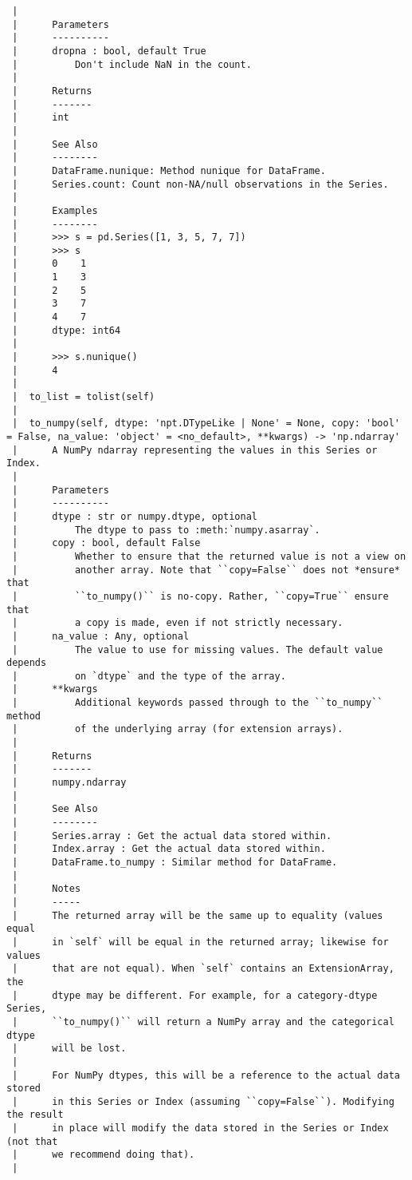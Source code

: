 \documentclass[
  letterpaper,
  DIV=11,
  numbers=noendperiod]{scrreprt}
\begin{document}
\begin{verbatim}
 |      
 |      Parameters
 |      ----------
 |      dropna : bool, default True
 |          Don't include NaN in the count.
 |      
 |      Returns
 |      -------
 |      int
 |      
 |      See Also
 |      --------
 |      DataFrame.nunique: Method nunique for DataFrame.
 |      Series.count: Count non-NA/null observations in the Series.
 |      
 |      Examples
 |      --------
 |      >>> s = pd.Series([1, 3, 5, 7, 7])
 |      >>> s
 |      0    1
 |      1    3
 |      2    5
 |      3    7
 |      4    7
 |      dtype: int64
 |      
 |      >>> s.nunique()
 |      4
 |  
 |  to_list = tolist(self)
 |  
 |  to_numpy(self, dtype: 'npt.DTypeLike | None' = None, copy: 'bool' = False, na_value: 'object' = <no_default>, **kwargs) -> 'np.ndarray'
 |      A NumPy ndarray representing the values in this Series or Index.
 |      
 |      Parameters
 |      ----------
 |      dtype : str or numpy.dtype, optional
 |          The dtype to pass to :meth:`numpy.asarray`.
 |      copy : bool, default False
 |          Whether to ensure that the returned value is not a view on
 |          another array. Note that ``copy=False`` does not *ensure* that
 |          ``to_numpy()`` is no-copy. Rather, ``copy=True`` ensure that
 |          a copy is made, even if not strictly necessary.
 |      na_value : Any, optional
 |          The value to use for missing values. The default value depends
 |          on `dtype` and the type of the array.
 |      **kwargs
 |          Additional keywords passed through to the ``to_numpy`` method
 |          of the underlying array (for extension arrays).
 |      
 |      Returns
 |      -------
 |      numpy.ndarray
 |      
 |      See Also
 |      --------
 |      Series.array : Get the actual data stored within.
 |      Index.array : Get the actual data stored within.
 |      DataFrame.to_numpy : Similar method for DataFrame.
 |      
 |      Notes
 |      -----
 |      The returned array will be the same up to equality (values equal
 |      in `self` will be equal in the returned array; likewise for values
 |      that are not equal). When `self` contains an ExtensionArray, the
 |      dtype may be different. For example, for a category-dtype Series,
 |      ``to_numpy()`` will return a NumPy array and the categorical dtype
 |      will be lost.
 |      
 |      For NumPy dtypes, this will be a reference to the actual data stored
 |      in this Series or Index (assuming ``copy=False``). Modifying the result
 |      in place will modify the data stored in the Series or Index (not that
 |      we recommend doing that).
 |      

\end{verbatim}
\end{document}
